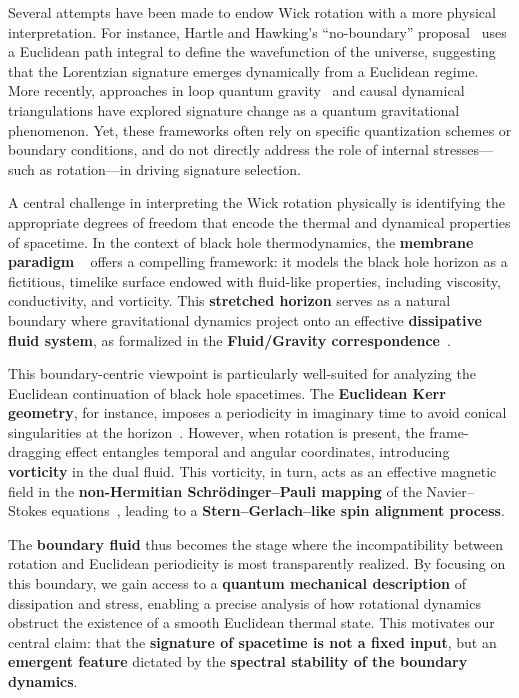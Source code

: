 \documentclass[11pt]{article}
\begin{document}
Several attempts have been made to endow Wick rotation with a more physical interpretation. For instance, Hartle and Hawking's ``no-boundary'' proposal~\cite{HartleHawking1983} uses a Euclidean path integral to define the wavefunction of the universe, suggesting that the Lorentzian signature emerges dynamically from a Euclidean regime. More recently, approaches in loop quantum gravity~\cite{BojowaladBrahma2016} and causal dynamical triangulations have explored signature change as a quantum gravitational phenomenon. Yet, these frameworks often rely on specific quantization schemes or boundary conditions, and do not directly address the role of internal stresses---such as rotation---in driving signature selection.

A central challenge in interpreting the Wick rotation physically is identifying the appropriate degrees of freedom that encode the thermal and dynamical properties of spacetime. In the context of black hole thermodynamics, the \textbf{membrane paradigm} ~\cite{MembraneParadigm1986} offers a compelling framework: it models the black hole horizon as a fictitious, timelike surface endowed with fluid-like properties, including viscosity, conductivity, and vorticity. This \textbf{stretched horizon} serves as a natural boundary where gravitational dynamics project onto an effective \textbf{dissipative fluid system}, as formalized in the \textbf{Fluid/Gravity correspondence}~\cite{FluidGravity2005}.

This boundary-centric viewpoint is particularly well-suited for analyzing the Euclidean continuation of black hole spacetimes. The \textbf{Euclidean Kerr geometry}, for instance, imposes a periodicity in imaginary time to avoid conical singularities at the horizon~\cite{GibbonsHawking1977}. However, when rotation is present, the frame-dragging effect entangles temporal and angular coordinates, introducing \textbf{vorticity} in the dual fluid. This vorticity, in turn, acts as an effective magnetic field in the \textbf{non-Hermitian Schr\"odinger--Pauli mapping} of the Navier--Stokes equations~\cite{MengYang2024}, leading to a \textbf{Stern--Gerlach--like spin alignment process}.

The \textbf{boundary fluid} thus becomes the stage where the incompatibility between rotation and Euclidean periodicity is most transparently realized. By focusing on this boundary, we gain access to a \textbf{quantum mechanical description} of dissipation and stress, enabling a precise analysis of how rotational dynamics obstruct the existence of a smooth Euclidean thermal state. This motivates our central claim: that the \textbf{signature of spacetime is not a fixed input}, but an \textbf{emergent feature} dictated by the \textbf{spectral stability of the boundary dynamics}.
\end{document}
